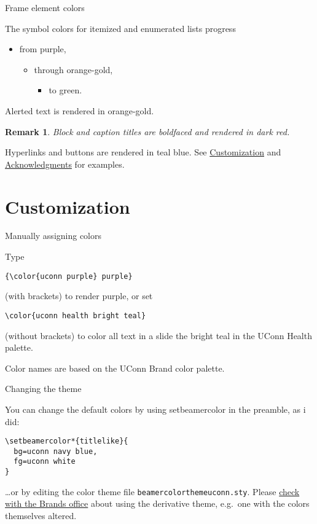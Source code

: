 \documentclass{beamer}
\newtheorem{remark}{Remark}
\begin{document}
\begin{frame}{Frame element colors}

The symbol colors for itemized and enumerated lists progress
\begin{itemize}
\item from purple,
\begin{itemize}
\item through orange-gold,
\begin{itemize}
\item to green.
\end{itemize}
\end{itemize}
\end{itemize}
\alert{Alerted text is rendered in orange-gold.}

\vfill\begin{remark}
Block and caption titles are boldfaced and rendered in dark red.
\end{remark}

\vfill
Hyperlinks and buttons are rendered in teal blue.
See \hyperlink{sec:customization}{Customization} and \hyperlink{slide:acknowledgments}{Acknowledgments} for examples.

\end{frame}


\section{Customization}
\label{sec:customization}

\begin{frame}[fragile]{Manually assigning colors}

Type
\begin{verbatim}
{\color{uconn purple} purple}
\end{verbatim}
(with brackets) to render {\color{uconn purple} purple}, or set
\begin{verbatim}
\color{uconn health bright teal}
\end{verbatim}
\color{uconn health bright teal}
(without brackets) to color all text in a slide the bright teal in the UConn Health palette.

\color{black}\vfill
Color names are based on the UConn Brand color palette.

\center\hyperlink{http://brand.uconn.edu/standards/color-palette/}{}

\end{frame}


\begin{frame}[fragile]{Changing the theme}

You can change the default colors by using setbeamercolor in the preamble, as i did:
\begin{verbatim}
\setbeamercolor*{titlelike}{
  bg=uconn navy blue,
  fg=uconn white
}
\end{verbatim}
\ldots or by editing the color theme file {\tt beamercolorthemeuconn.sty}.
Please \hyperlink{mailto:brand@uconn.edu}{check with the Brands office} about using the derivative theme, e.g.\ one with the colors themselves altered.

\end{frame}
\end{document}
